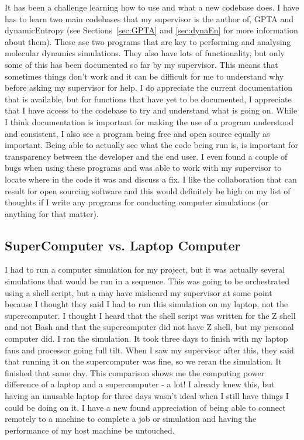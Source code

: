 \documentclass[11pt]{article}
\begin{document}
It has been a challenge learning how to use and what a new codebase does. I have has to learn two main codebases that my supervisor is the author of, GPTA and dynamicEntropy (see Sections~\ref{sec:GPTA} and \ref{sec:dynaEn} for more information about them). These ase two programs that are key to performing and analysing molecular dynamics simulations. They also have lots of functionality, but only some of this has been documented so far by my supervisor. This means that sometimes things don't work and it can be difficult for me to understand why before asking my supervisor for help. I do appreciate the current documentation that is available, but for functions that have yet to be documented, I appreciate that I have access to the codebase to try and understand what is going on. While I think documentation is important for making the use of a program understood and consistent, I also see a program being free and open source equally as important. Being able to actually see what the code being run is, is important for transparency between the developer and the end user. I even found a couple of bugs when using these programs and was able to work with my supervisor to locate where in the code it was and discuss a fix. I like the collaboration that can result for open sourcing software and this would definitely be high on my list of thoughts if I write any programs for conducting computer simulations (or anything for that matter).

\subsection{SuperComputer vs. Laptop Computer}

I had to run a computer simulation for my project, but it was actually several simulations that would be run in a sequence. This was going to be orchestrated using a shell script, but a may have misheard my supervisor at some point because I thought they said I had to run this simulation on my laptop, not the supercomputer. I thought I heard that the shell script was written for the Z shell and not Bash and that the supercomputer did not have Z shell, but my personal computer did. I ran the simulation. It took three days to finish with my laptop fans and processor going full tilt. When I saw my supervisor after this, they said that running it on the supercomputer was fine, so we reran the simulation. It finished that same day. This comparison shows me the computing power difference of a laptop and a supercomputer - a lot! I already knew this, but having an unusable laptop for three days wasn't ideal when I still have things I could be doing on it. I have a new found appreciation of being able to connect remotely to a machine to complete a job or simulation and having the performance of my host machine be untouched.
\end{document}
